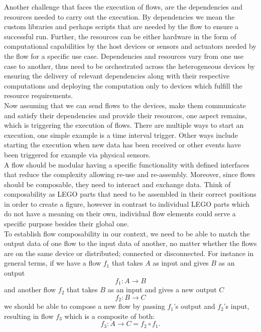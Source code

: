 \noindent Another challenge that faces the execution of  flows, are the dependencies and resources needed to carry out the execution. By dependencies we mean the custom libraries and perhaps scripts that are needed by the flow to ensure a successful run. Further, the resources can be either hardware in the form of computational capabilities by the host devices or sensors and actuators needed by the flow for a specific use case. Dependencies and resources  vary from one use case to another, thus need to be orchestrated across the heterogeneous devices  by  ensuring the delivery of relevant dependencies along with their respective computations and deploying the computation only to devices which fulfill the resource requirements.\\
 
\noindent Now assuming that we can send flows to the devices, make them communicate and satisfy their dependencies and provide their resources, one aspect remains, which is triggering the execution of flows. There are multiple ways to start an execution, one simple example is a time interval trigger. Other ways include starting the execution when new data has been received or other events have been triggered for example via physical sensors.\\


\noindent A flow should be modular having a specific functionality with defined interfaces that reduce the complexity allowing re-use and re-assembly. Moreover, since flows should be composable, they need to interact and exchange data. Think of composability as LEGO parts that need to be assembled in their correct positions in order to create a figure, however in contrast to individual LEGO parts which do not have a meaning on their own, individual flow elements could serve a specific purpose besides their global one. \\
 
\noindent  To establish flow composability in our context, we need to be able to match the output data of one flow to the input data of another, no matter whether the flows are on the same device or distributed; connected or disconnected. For instance in general terms, if we have a flow \(f_1\) that takes \(A\) as input and gives \(B\) as an output
\[ f_1 : A  \to B  \]
and another flow \(f_2\) that takes \(B\) as an input and gives a new output \(C\)
\[ f_2 : B  \to C  \]
we should be able to compose a new flow by passing  \(f_1\)'s output and  \(f_2\)'s input, resulting in flow \(f_3\) which is a composite of both:
\[f_3: A \to C = f_2 \circ f_1 .\]

